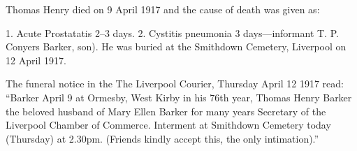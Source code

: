 Thomas Henry died on 9 April 1917\cite{THBdeathcert} and the cause of death was given as:

 1. Acute Prostatatis 2--3 days. 2. Cystitis pneumonia 3 days---informant T. P. Conyers Barker, son).  He was buried at the Smithdown Cemetery, Liverpool on 12 April 1917.\cite{ToxtethBarker20}
 
 The funeral notice in the The Liverpool Courier, Thursday April 12 1917 read:
``Barker April 9 at Ormesby, West Kirby in his 76th year, Thomas Henry Barker the beloved husband of Mary Ellen Barker for many years Secretary of the Liverpool Chamber of Commerce. Interment at Smithdown Cemetery today (Thursday) at 2.30pm. (Friends kindly accept this, the only intimation).''
